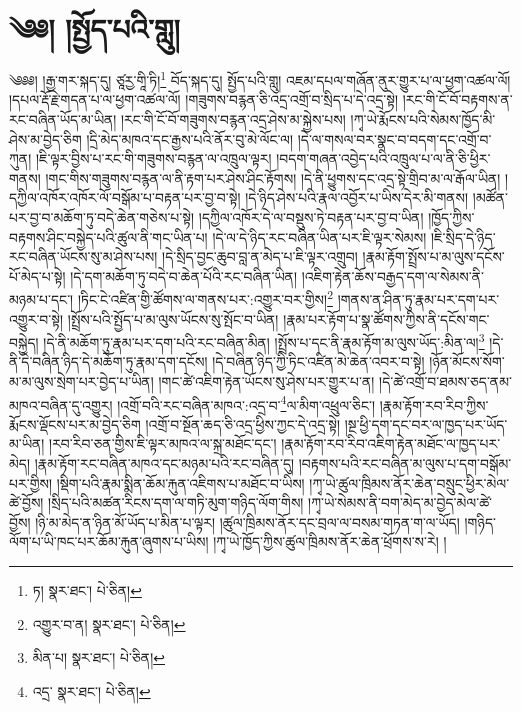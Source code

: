 \setcounter{footnote}{0} 
\chapter{༄༅། །སྤྱོད་པའི་གླུ།}༄༅༅། །རྒྱ་གར་སྐད་དུ། ཙཱརྱ་གཱི་ཏི།\footnote{ཏ།  སྣར་ཐང་།  པེ་ཅིན། } བོད་སྐད་དུ། སྤྱོད་པའི་གླུ། འཇམ་དཔལ་གཞོན་ནུར་གྱུར་པ་ལ་ཕྱག་འཚལ་ལོ། །དཔལ་རྡོ་རྗེ་གདན་པ་ལ་ཕྱག་འཚལ་ལོ། །གཟུགས་བརྙན་ཅི་འདྲ་འགྲོ་བ་སྲིད་པ་དེ་འདྲ་སྟེ། །རང་གི་ངོ་བོ་བརྟགས་ན་རང་བཞིན་ཡོད་མ་ཡིན། །རང་གི་ངོ་བོ་གཟུགས་བརྙན་འདྲ་ཤེས་མ་སྐྱེས་པས། །ཀྭ་ཡེ་རྨོངས་པའི་སེམས་ཁྱོད་མི་ཤེས་མ་བྱེད་ཅིག །དྲི་མེད་མཁའ་དང་རྒྱས་པའི་ནོར་བུ་མེ་ལོང་ལ། །དེ་ལ་གསལ་བར་སྣང་བ་བདག་དང་འགྲོ་བ་ཀུན། །ཇི་ལྟར་བྱིས་པ་རང་གི་གཟུགས་བརྙན་ལ་འཁྲུལ་ལྟར། །བདག་གཞན་འབྱེད་པའི་འཁྲུལ་པ་ལ་ནི་ཅི་ཕྱིར་གནས། །གང་གིས་གཟུགས་བརྙན་ལ་ནི་རྟག་པར་ཤེས་ཤིང་རྟོགས། །དེ་ནི་ཕྱུགས་དང་འདྲ་སྟེ་གྲིབ་མ་ལ་རྒོལ་ཡིན། །དཀྱིལ་འཁོར་འཁོར་ལོ་བསྒོམ་པ་བརྟན་པར་བྱ་བ་སྟེ། །དེ་ཉིད་ཤེས་པའི་རྣལ་འབྱོར་པ་ཡིས་དེར་མི་གནས། །མཚོན་པར་བྱ་བ་མཆོག་ཏུ་བདེ་ཆེན་གཅེས་པ་སྟེ། །དཀྱིལ་འཁོར་དེ་ལ་བསྡུས་ཏེ་བརྟན་པར་བྱ་བ་ཡིན། །ཁྱོད་ཀྱིས་བརྟགས་ཤིང་བསྐྱེད་པའི་ཚུལ་ནི་གང་ཡིན་པ། །དེ་ལ་དེ་ཉིད་རང་བཞིན་ཡིན་པར་ཇི་ལྟར་སེམས། །ཇི་སྲིད་དེ་ཉིད་རང་བཞིན་ཡོངས་སུ་མ་ཤེས་པས། །དེ་སྲིད་བྱང་ཆུབ་བླ་ན་མེད་པ་ཇི་ལྟར་འགྲུབ། །རྣམ་རྟོག་སྤྲོས་པ་མ་ལུས་དངོས་པོ་མེད་པ་སྟེ། །དེ་དག་མཆོག་ཏུ་བདེ་བ་ཆེན་པོའི་རང་བཞིན་ཡིན། །འཇིག་རྟེན་ཆོས་བརྒྱད་དག་ལ་སེམས་ནི་མཉམ་པ་དང་། །ཏིང་ངེ་འཛིན་གྱི་ཚོགས་ལ་གནས་པར་:འགྱུར་བར་གྱིས།\footnote{འགྱུར་བ་ན།  སྣར་ཐང་།  པེ་ཅིན། } །གནས་ན་ཤིན་ཏུ་རྣམ་པར་དག་པར་འགྱུར་བ་སྟེ། །སྤྲོས་པའི་སྤྱོད་པ་མ་ལུས་ཡོངས་སུ་སྤོང་བ་ཡིན། །རྣམ་པར་རྟོག་པ་སྣ་ཚོགས་ཀྱིས་ནི་དངོས་གང་བསྐྱེད། །དེ་ནི་མཆོག་ཏུ་རྣམ་པར་དག་པའི་རང་བཞིན་མིན། །སྤྲོས་པ་དང་ནི་རྣམ་རྟོག་མ་ལུས་ཡོད་:མིན་ལ།\footnote{མིན་པ།  སྣར་ཐང་།  པེ་ཅིན། } །དེ་ནི་དེ་བཞིན་ཉིད་དེ་མཆོག་ཏུ་རྣམ་དག་དངོས། །དེ་བཞིན་ཉིད་ཀྱི་ཏིང་འཛིན་མེ་ཆེན་འབར་བ་སྟེ། །ཉོན་མོངས་སོག་མ་མ་ལུས་སྲེག་པར་བྱེད་པ་ཡིན། །གང་ཚེ་འཇིག་རྟེན་ཡོངས་སུ་ཤེས་པར་གྱུར་པ་ན། །དེ་ཚེ་འགྲོ་བ་ཐམས་ཅད་ནམ་མཁའ་བཞིན་དུ་འགྱུར། །འགྲོ་བའི་རང་བཞིན་མཁའ་:འདྲ་བ་\footnote{འདྲ་  སྣར་ཐང་།  པེ་ཅིན། }ལ་མིག་འཕྲུལ་ཅིང་། །རྣམ་རྟོག་རབ་རིབ་ཀྱིས་རྨོངས་ལྡོངས་པར་མ་བྱེད་ཅིག །འགྲོ་བ་སྔོན་ཆད་ཅི་འདྲ་ཕྱིས་ཀྱང་དེ་འདྲ་སྟེ། །སྔ་ཕྱི་དག་དང་བར་ལ་ཁྱད་པར་ཡོད་མ་ཡིན། །རབ་རིབ་ཅན་གྱིས་ཇི་ལྟར་མཁའ་ལ་སྐྲ་མཐོང་དང་། །རྣམ་རྟོག་རབ་རིབ་འཇིག་རྟེན་མཐོང་ལ་ཁྱད་པར་མེད། །རྣམ་རྟོག་རང་བཞིན་མཁའ་དང་མཉམ་པའི་རང་བཞིན་དུ། །བརྟགས་པའི་རང་བཞིན་མ་ལུས་པ་དག་བསྒོམ་པར་གྱིས། །སྡིག་པའི་རྣམ་སྨིན་ཆོམ་རྐུན་འཇིགས་པ་མཐོང་བ་ཡིས། །ཀྭ་ཡེ་ཚུལ་ཁྲིམས་ནོར་ཆེན་བསྲུང་ཕྱིར་མེལ་ཚེ་བྱོས། །སྲིད་པའི་མཚན་རིངས་དག་ལ་གཏི་མུག་གཉིད་ལོག་གིས། །ཀྭ་ཡེ་སེམས་ནི་བག་མེད་མ་བྱེད་མེལ་ཚེ་བྱོས། །ཉི་མ་མེད་ན་ཉིན་མོ་ཡོད་པ་མིན་པ་ལྟར། །ཚུལ་ཁྲིམས་ནོར་དང་བྲལ་ལ་བསམ་གཏན་ག་ལ་ཡོད། །གཉིད་ལོག་པ་ཡི་ཁང་པར་ཆོམ་རྐུན་ཞུགས་པ་ཡིས། །ཀྭ་ཡེ་ཁྱོད་ཀྱིས་ཚུལ་ཁྲིམས་ནོར་ཆེན་ཕྲོགས་ས་རེ། །
